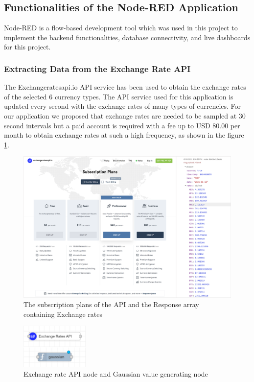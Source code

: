 \subsection{Functionalities of the Node-RED Application}

Node-RED is a flow-based development tool which was used in this project to implement the backend functionalities, database connectivity, and live dashboards for this project.

\subsubsection{Extracting Data from the Exchange Rate API}

The Exchangeratesapi.io API service has been used to obtain the exchange rates of the selected 6 currency types. The API service used for this application is updated every second with the exchange rates of many types of currencies. For our application we proposed that exchange rates are needed to be sampled at 30 second intervals but a paid account is required with a fee up to USD 80.00 per month to obtain exchange rates at such a high frequency, as shown in the figure \ref{fig:exapi}.

\begin{figure}[H]
    \centering
      \includegraphics[width=1\textwidth]{images/exapi.png}
    \caption{The subscription plans of the API and the Response array containing Exchange rates}
    \label{fig:exapi}
\end{figure}

\begin{figure}[H]
    \centering
      \includegraphics[width=0.3\textwidth]{images/apinodes.png}
    \caption{ Exchange rate API node and Gaussian value generating node}
    \label{fig:apinodes}
\end{figure}

